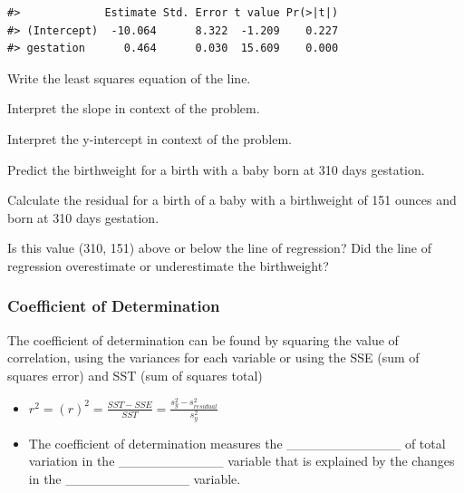 \documentclass[
]{report}
\begin{document}
\begin{verbatim}
#>             Estimate Std. Error t value Pr(>|t|)
#> (Intercept)  -10.064      8.322  -1.209    0.227
#> gestation      0.464      0.030  15.609    0.000
\end{verbatim}

Write the least squares equation of the line.

\vspace{0.6in}

Interpret the slope in context of the problem.

\vspace{0.6in}

Interpret the y-intercept in context of the problem.

\vspace{0.6in}

Predict the birthweight for a birth with a baby born at 310 days gestation.

\vspace{0.5in}

Calculate the residual for a birth of a baby with a birthweight of 151 ounces and born at 310 days gestation.

\vspace{0.5in}

Is this value (310, 151) above or below the line of regression? Did the line of regression overestimate or underestimate the birthweight?

\vspace{0.2in}

\subsubsection*{Coefficient of Determination}\label{coefficient-of-determination}

The coefficient of determination can be found by squaring the value of correlation, using the variances for each variable or using the SSE (sum of squares error) and SST (sum of squares total)

\begin{itemize}
\item
  \(r^2 = (r)^2 = \frac{SST - SSE}{SST} = \frac{s^2_y - s^2_{residual}}{s^2_y}\)
\item
  The coefficient of determination measures the \_\_\_\_\_\_\_\_\_\_\_\_ of total variation in the \_\_\_\_\_\_\_\_\_\_\_ variable that is explained by the changes in the \_\_\_\_\_\_\_\_\_\_\_\_\_ variable.
\end{itemize}
\end{document}
